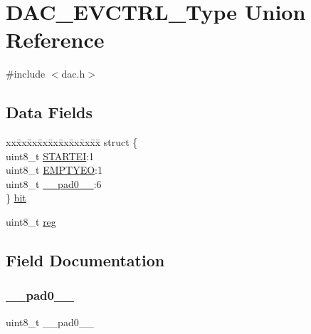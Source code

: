 \hypertarget{union_d_a_c___e_v_c_t_r_l___type}{}\section{D\+A\+C\+\_\+\+E\+V\+C\+T\+R\+L\+\_\+\+Type Union Reference}
\label{union_d_a_c___e_v_c_t_r_l___type}


{\ttfamily \#include $<$dac.\+h$>$}

\subsection*{Data Fields}
\begin{DoxyCompactItemize}
\item 
\begin{tabbing}
xx\=xx\=xx\=xx\=xx\=xx\=xx\=xx\=xx\=\kill
struct \{\\
\>uint8\_t \mbox{\hyperlink{union_d_a_c___e_v_c_t_r_l___type_aa41cf9b362f9377e62cd91c88353fddc}{STARTEI}}:1\\
\>uint8\_t \mbox{\hyperlink{union_d_a_c___e_v_c_t_r_l___type_a0d6a3a8ae3093ec1e9b030c9f3b6148c}{EMPTYEO}}:1\\
\>uint8\_t \mbox{\hyperlink{union_d_a_c___e_v_c_t_r_l___type_a8b4eebe79ded0459acec2f4950102ba3}{\_\_pad0\_\_}}:6\\
\} \mbox{\hyperlink{union_d_a_c___e_v_c_t_r_l___type_ac15fe2161f8f0d2bcf6655874561bce9}{bit}}\\

\end{tabbing}\item 
uint8\+\_\+t \mbox{\hyperlink{union_d_a_c___e_v_c_t_r_l___type_a9428adc9af4653a2050e2536b55dec8d}{reg}}
\end{DoxyCompactItemize}


\subsection{Field Documentation}
\mbox{\label{union_d_a_c___e_v_c_t_r_l___type_a8b4eebe79ded0459acec2f4950102ba3}} 
\subsubsection{\texorpdfstring{\_\_pad0\_\_}{\_\_pad0\_\_}}
{\footnotesize\ttfamily uint8\+\_\+t \+\_\+\+\_\+pad0\+\_\+\+\_\+}

